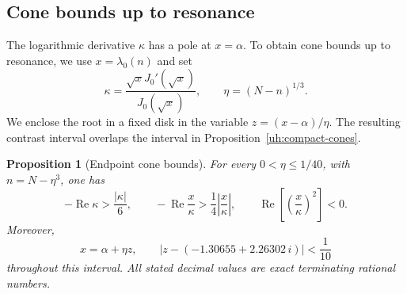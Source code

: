 \documentclass[a4paper,11pt]{amsart}
\numberwithin{equation}{section}
\theoremstyle{plain}
\newtheorem{proposition}[theorem]{Proposition}
\theoremstyle{definition}
\begin{document}
\subsection{Cone bounds up to resonance}
\label{uhe:section}

The logarithmic derivative \(\kappa\) has a pole at \(x=\alpha\).
To obtain cone bounds up to resonance, we use \(x=\lambda_0(n)\)
and set
\[
 \kappa=\frac{\sqrt xJ_0'(\sqrt x)}{J_0(\sqrt x)},\qquad
 \eta=(N-n)^{1/3}.
\]
We enclose the root in a fixed disk in the variable
\(z=(x-\alpha)/\eta\). The resulting contrast interval overlaps
the interval in Proposition~\ref{uh:compact-cones}.

\begin{proposition}[Endpoint cone bounds]\label{uhe:cones}
For every \(0<\eta\le1/40\), with \(n=N-\eta^3\), one has
\[
 -\operatorname{Re}\kappa>\frac{|\kappa|}{6},\qquad
 -\operatorname{Re}\frac{x}{\kappa}>
                 \frac14\left|\frac{x}{\kappa}\right|,\qquad
 \operatorname{Re}\!\left[\left(\frac{x}{\kappa}\right)^2\right]<0.
\]
Moreover,
\[
 x=\alpha+\eta z,\qquad
 \left|z-\left(-1.30655+2.26302\,i\right)\right|<\frac1{10}
\]
throughout this interval. All stated decimal values are exact
terminating rational numbers.
\end{proposition}
\end{document}
